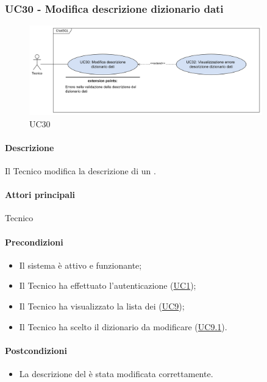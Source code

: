 \subsubsection{UC30 - Modifica descrizione dizionario dati}\label{UC30}

\begin{figure}[H]
  \centering
  \includegraphics[width=0.90\textwidth]{assets/uc30.png}
  \caption{UC30}
\end{figure}

\paragraph*{Descrizione}
Il Tecnico modifica la descrizione di un .

\paragraph*{Attori principali}
Tecnico

\paragraph*{Precondizioni}
\begin{itemize}
  \item Il sistema è attivo e funzionante;
  \item Il Tecnico ha effettuato l'autenticazione (\hyperref[UC1]{UC1});
  \item Il Tecnico ha visualizzato la lista dei  (\hyperref[UC9]{UC9});
  \item Il Tecnico ha scelto il dizionario da modificare (\hyperref[UC9.1]{UC9.1}).
\end{itemize}

\paragraph*{Postcondizioni}
\begin{itemize}
  \item La descrizione del  è stata modificata correttamente.
\end{itemize}

